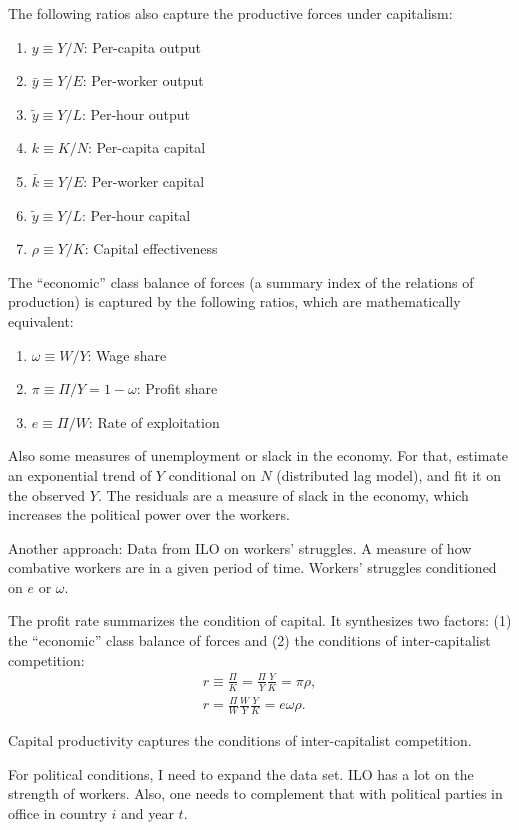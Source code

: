 \documentclass[pt=12]{article}
\begin{document}
The following ratios also capture the productive forces under capitalism:
\begin{enumerate}
\item $y \equiv Y/N$: Per-capita output
\item $\bar{y} \equiv Y/E$: Per-worker output
\item $\tilde{y} \equiv Y/L$: Per-hour output
\item $k \equiv K/N$: Per-capita capital
\item $\bar{k} \equiv Y/E$: Per-worker capital
\item $\tilde{y} \equiv Y/L$: Per-hour capital
\item $\rho \equiv Y/K$: Capital effectiveness
\end{enumerate}

The ``economic'' class balance of forces (a summary index of the relations of production) is captured by the following ratios, which are mathematically equivalent:
\begin{enumerate}
\item $\omega \equiv W/Y$: Wage share
\item $\pi \equiv \Pi/Y = 1 - \omega$: Profit share
\item $e \equiv \Pi/W$: Rate of exploitation
\end{enumerate}

Also some measures of unemployment or slack in the economy.  For that, estimate an exponential trend of $Y$ conditional on $N$ (distributed lag model), and fit it on the observed $Y$.  The residuals are a measure of slack in the economy, which increases the political power over the workers.

Another approach: Data from ILO on workers' struggles.  A measure of how combative workers are in a given period of time.  Workers' struggles conditioned on $e$ or $\omega$.

The profit rate summarizes the condition of capital.  It synthesizes two factors: (1) the ``economic'' class balance of forces and (2) the conditions of inter-capitalist competition:
\begin{eqnarray}
r \equiv \frac{\Pi}{K} = \frac{\Pi}{Y} \frac{Y}{K} = \pi \rho, \\
r = \frac{\Pi}{W} \frac{W}{Y} \frac{Y}{K} = e \omega \rho.
\end{eqnarray}

Capital productivity captures the conditions of inter-capitalist competition.

For political conditions, I need to expand the data set.  ILO has a lot on the strength of workers.  Also, one needs to complement that with political parties in office in country $i$ and year $t$.
\end{document}
